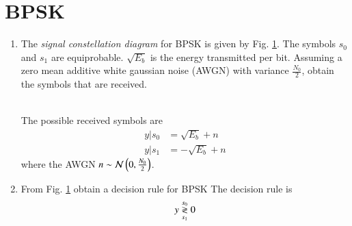 \documentclass[journal,12pt,twocolumn]{IEEEtran}
\renewcommand\thesection{\arabic{section}}
\begin{document}
\section{BPSK}
\begin{enumerate}[label=\thesection.\arabic*.,ref=\thesection.\theenumi]

\item The {\em signal constellation diagram} for BPSK is given by Fig. \ref{fig:ee18btech11042_bpsk_const}.  The symbols $s_0$ and $s_1$ are equiprobable.  $\sqrt{E_b}$ is the energy transmitted per bit. Assuming a zero mean additive white gaussian noise (AWGN) with variance $\frac{N_0}{2}$,
obtain the symbols that are received.
%
\begin{figure}[!ht]
\centering
\resizebox{\columnwidth}{!}{}
\caption{}
\label{fig:ee18btech11042_bpsk_const}
\end{figure}
\\
\solution The possible received symbols are
\begin{align}
y|s_0 &= \sqrt{E_b} + n
\\
y|s_1 &= -\sqrt{E_b} + n
\end{align}
%
where the AWGN $n \sim \mathcal{N}\left(0,\frac{N_0}{2}\right)$.
%
\item

\label{prob:bpsk_decision}
From Fig. \ref{fig:ee18btech11042_bpsk_const} obtain a decision rule for BPSK
\solution The decision rule is
\begin{equation}
y \overset{s_0}{\underset{s_1}{\gtrless}} 0
\end{equation}


\end{enumerate}
\end{document}
